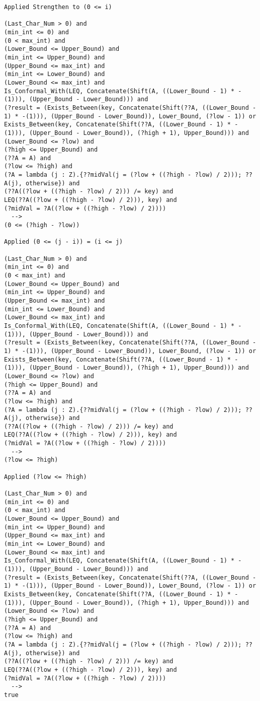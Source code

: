\begin{lstlisting}[language=resolve]
Applied Strengthen to (0 <= i)

(Last_Char_Num > 0) and
(min_int <= 0) and
(0 < max_int) and
(Lower_Bound <= Upper_Bound) and
(min_int <= Upper_Bound) and
(Upper_Bound <= max_int) and
(min_int <= Lower_Bound) and
(Lower_Bound <= max_int) and
Is_Conformal_With(LEQ, Concatenate(Shift(A, ((Lower_Bound - 1) * -(1))), (Upper_Bound - Lower_Bound))) and
(?result = (Exists_Between(key, Concatenate(Shift(??A, ((Lower_Bound - 1) * -(1))), (Upper_Bound - Lower_Bound)), Lower_Bound, (?low - 1)) or Exists_Between(key, Concatenate(Shift(??A, ((Lower_Bound - 1) * -(1))), (Upper_Bound - Lower_Bound)), (?high + 1), Upper_Bound))) and
(Lower_Bound <= ?low) and
(?high <= Upper_Bound) and
(??A = A) and
(?low <= ?high) and
(?A = lambda (j : Z).{??midVal(j = (?low + ((?high - ?low) / 2))); ??A(j), otherwise}) and
(??A((?low + ((?high - ?low) / 2))) /= key) and
LEQ(??A((?low + ((?high - ?low) / 2))), key) and
(?midVal = ?A((?low + ((?high - ?low) / 2))))
  -->
(0 <= (?high - ?low))

Applied (0 <= (j - i)) = (i <= j)

(Last_Char_Num > 0) and
(min_int <= 0) and
(0 < max_int) and
(Lower_Bound <= Upper_Bound) and
(min_int <= Upper_Bound) and
(Upper_Bound <= max_int) and
(min_int <= Lower_Bound) and
(Lower_Bound <= max_int) and
Is_Conformal_With(LEQ, Concatenate(Shift(A, ((Lower_Bound - 1) * -(1))), (Upper_Bound - Lower_Bound))) and
(?result = (Exists_Between(key, Concatenate(Shift(??A, ((Lower_Bound - 1) * -(1))), (Upper_Bound - Lower_Bound)), Lower_Bound, (?low - 1)) or Exists_Between(key, Concatenate(Shift(??A, ((Lower_Bound - 1) * -(1))), (Upper_Bound - Lower_Bound)), (?high + 1), Upper_Bound))) and
(Lower_Bound <= ?low) and
(?high <= Upper_Bound) and
(??A = A) and
(?low <= ?high) and
(?A = lambda (j : Z).{??midVal(j = (?low + ((?high - ?low) / 2))); ??A(j), otherwise}) and
(??A((?low + ((?high - ?low) / 2))) /= key) and
LEQ(??A((?low + ((?high - ?low) / 2))), key) and
(?midVal = ?A((?low + ((?high - ?low) / 2))))
  -->
(?low <= ?high)

Applied (?low <= ?high)

(Last_Char_Num > 0) and
(min_int <= 0) and
(0 < max_int) and
(Lower_Bound <= Upper_Bound) and
(min_int <= Upper_Bound) and
(Upper_Bound <= max_int) and
(min_int <= Lower_Bound) and
(Lower_Bound <= max_int) and
Is_Conformal_With(LEQ, Concatenate(Shift(A, ((Lower_Bound - 1) * -(1))), (Upper_Bound - Lower_Bound))) and
(?result = (Exists_Between(key, Concatenate(Shift(??A, ((Lower_Bound - 1) * -(1))), (Upper_Bound - Lower_Bound)), Lower_Bound, (?low - 1)) or Exists_Between(key, Concatenate(Shift(??A, ((Lower_Bound - 1) * -(1))), (Upper_Bound - Lower_Bound)), (?high + 1), Upper_Bound))) and
(Lower_Bound <= ?low) and
(?high <= Upper_Bound) and
(??A = A) and
(?low <= ?high) and
(?A = lambda (j : Z).{??midVal(j = (?low + ((?high - ?low) / 2))); ??A(j), otherwise}) and
(??A((?low + ((?high - ?low) / 2))) /= key) and
LEQ(??A((?low + ((?high - ?low) / 2))), key) and
(?midVal = ?A((?low + ((?high - ?low) / 2))))
  -->
true


\end{lstlisting}
